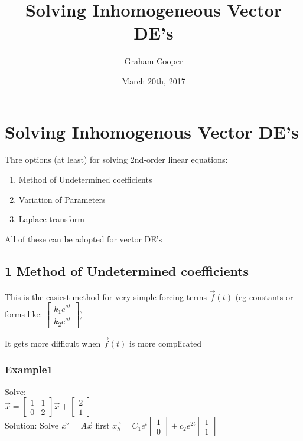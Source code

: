 \documentclass[12pt]{article}
\title{\vspace{-15ex}Solving Inhomogeneous Vector DE's\vspace{-1ex}}
\date{March 20th, 2017}
\author{Graham Cooper}
\begin{document}
	\maketitle
	
	\section*{Solving Inhomogenous Vector DE's}
	
	Thre options (at least) for solving 2nd-order linear equations:\\
	\begin{enumerate}
		\item Method of Undetermined coefficients
		\item Variation of Parameters
		\item Laplace transform
	\end{enumerate}

	All of these can be adopted for vector DE's\\
	
	\subsection*{1 Method of Undetermined coefficients}
	This is the easiest method for very simple forcing terms $\overrightarrow{f}(t)$ (eg constants or forms like: $\begin{bmatrix}
	k_1e^{at} \\ k_2e^{at}
	\end{bmatrix})$
	
	It gets more difficult when $\overrightarrow{f}(t)$ is more complicated\\
	
	\subsubsection*{Example1}
	Solve:\\
	$\overrightarrow{x} = \begin{bmatrix}
	1 & 1 \\ 0 & 2
	\end{bmatrix} \overrightarrow{x} + \begin{bmatrix}
	2 \\ 1
	\end{bmatrix}$\\
	Solution: Solve $\overrightarrow{x}' = A\overrightarrow{x}$ first $\overrightarrow{x_h} = C_1e^t\begin{bmatrix}
	1 \\ 0
	\end{bmatrix} + c_2e^{2t}\begin{bmatrix}
	1 \\ 1
	\end{bmatrix}$\\
	
\end{document}
